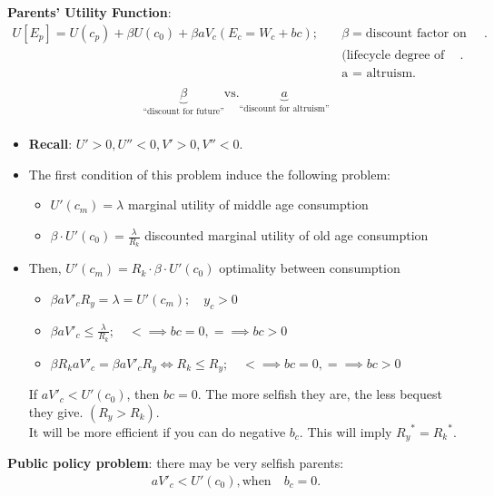 \documentclass[14pt,notitlepage]{article}
\begin{document}
\textbf{Parents' Utility Function}:
\begin{align*}
U[E_p] = U(c_p) + \beta U(c_0) + \beta a V_c (E_c = W_c + bc); \quad &\beta = \text{discount factor on ``old days consumption''}. \\ &\text{(lifecycle degree of discount)}. \\ &\text{a = altruism}. \\
\end{align*}
\begin{align*}
\underbrace{\beta}_{\text{``discount for future''}} \text{vs.} \underbrace{a}_{\text{``discount for altruism''}} \\
\end{align*}
\begin{itemize}
\item \textbf{Recall}: $U' > 0, U'' < 0, V' > 0, V'' < 0$.
\item The first condition of this problem induce the following problem:
    \begin{itemize}
    \item $U'(c_m) = \lambda$ \quad marginal utility of middle age consumption
    \item $\beta \cdot U'(c_0) = \frac{\lambda}{R_k}$ \quad discounted marginal utility of old age consumption
    \end{itemize}
\item Then, $U'(c_m) = R_k \cdot \beta \cdot U'(c_0)$ \quad optimality between consumption
    \begin{itemize}
    \item $\beta a V'_c R_y = \lambda = U'(c_m); \quad y_c > 0$
    \item $\beta a V'_c \leq \frac{\lambda}{R_k}; \quad < \implies bc = 0, = \implies bc > 0$
    \item $\beta R_k a V'_c = \beta a V'_c R_y \Leftrightarrow R_k \leq R_y; \quad < \implies bc = 0, = \implies bc > 0$
    \end{itemize}

If $a V'_c < U'(c_0)$, then $bc = 0$. The more selfish they are, the less bequest they give. $(R_y > R_k)$. \\
It will be more efficient if you can do negative $b_c$. This will imply ${R_y}^* = {R_k}^*$.
\end{itemize}

\textbf{Public policy problem}: \quad there may be very selfish parents:
\begin{align*}
aV'_c < U'(c_0), \text{when} \quad b_c = 0.
\end{align*}
\end{document}

